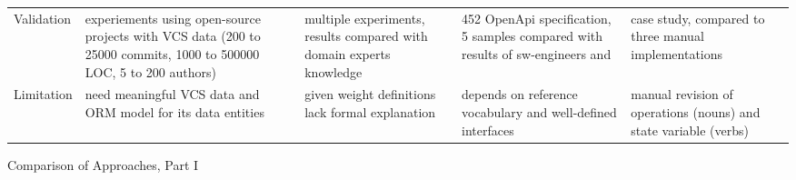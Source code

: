 {\begin{landscape}
\begin{threeparttable}[h!]
\begin{tabularx}{\linewidth}{XXXXX}
			Validation & experiements using open-source projects with VCS data (200 to 25000 commits, 1000 to 500000 LOC, 5 to 200 authors)  & multiple experiments, results compared with domain experts knowledge  & 452 OpenApi specification, 5 samples compared with results of sw-engineers and \cite{ServiceCutter}& case study, compared to three manual implementations \\
			
			Limitation & need meaningful VCS data and ORM model for its data entities & given weight definitions lack formal explanation    & depends on reference vocabulary and well-defined interfaces & manual revision of operations (nouns) and state variable (verbs) \\
			
		\end{tabularx}
		\caption{Comparison of Approaches, Part I}
	\label{tab:compareApproaches1}
	 
	
	
	\end{threeparttable}
	

	
	\end{landscape}
	\clearpage%
}

